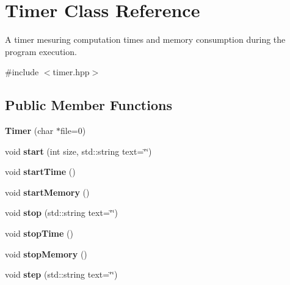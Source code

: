 \hypertarget{class_timer}{\section{Timer Class Reference}
\label{class_timer}
}


A timer mesuring computation times and memory consumption during the program execution.  




{\ttfamily \#include $<$timer.\-hpp$>$}

\subsection*{Public Member Functions}
\begin{DoxyCompactItemize}
\item 
\hypertarget{class_timer_a14edf0bdfc5a214895d321e7ae69365b}{{\bfseries Timer} (char $\ast$file=0)}\label{class_timer_a14edf0bdfc5a214895d321e7ae69365b}

\item 
\hypertarget{class_timer_acc61f0c4f2c1e26ba0bb62d367f0977e}{void {\bfseries start} (int size, std\-::string text=\char`\"{}\char`\"{})}\label{class_timer_acc61f0c4f2c1e26ba0bb62d367f0977e}

\item 
\hypertarget{class_timer_a5771baafd265be353ab78a4bb77329f9}{void {\bfseries start\-Time} ()}\label{class_timer_a5771baafd265be353ab78a4bb77329f9}

\item 
\hypertarget{class_timer_afada34fd58fb4729b9a6ee7a445f5133}{void {\bfseries start\-Memory} ()}\label{class_timer_afada34fd58fb4729b9a6ee7a445f5133}

\item 
\hypertarget{class_timer_afc259e85201ab94f291b36ed97dbd5e2}{void {\bfseries stop} (std\-::string text=\char`\"{}\char`\"{})}\label{class_timer_afc259e85201ab94f291b36ed97dbd5e2}

\item 
\hypertarget{class_timer_a71c4bba47ccad8ed4131922d1cd6d689}{void {\bfseries stop\-Time} ()}\label{class_timer_a71c4bba47ccad8ed4131922d1cd6d689}

\item 
\hypertarget{class_timer_a55ad7a96c2e75c4a1a7209c8eb89ee9d}{void {\bfseries stop\-Memory} ()}\label{class_timer_a55ad7a96c2e75c4a1a7209c8eb89ee9d}

\item 
\hypertarget{class_timer_a88fa29d9f2422df0ad2ed43b1c28cc04}{void {\bfseries step} (std\-::string text=\char`\"{}\char`\"{})}\label{class_timer_a88fa29d9f2422df0ad2ed43b1c28cc04}

\end{DoxyCompactItemize}


